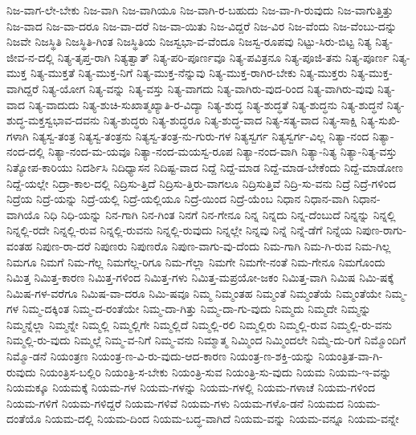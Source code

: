 {ನಿಜ-ವಾಗ-ಲೇ-ಬೇಕು
ನಿಜ-ವಾಗಿ
ನಿಜ-ವಾಗಿಯೂ
ನಿಜ-ವಾಗಿ-ರ-ಬಹುದು
ನಿಜ-ವಾ-ಗಿ-ರುವುದು
ನಿಜ-ವಾಗುತ್ತಿತ್ತು
ನಿಜ-ವಾದ
ನಿಜ-ವಾ-ದರೂ
ನಿಜ-ವಾ-ದರೆ
ನಿಜ-ವಾ-ಯಿತು
ನಿಜ-ವಿದ್ದರೆ
ನಿಜ-ವಿರ
ನಿಜ-ವೆಂದು
ನಿಜ-ವೆಂಬು-ದನ್ನು
ನಿಜವೇ
ನಿಜಸ್ಥಿತಿ
ನಿಜಸ್ಥಿತಿ-ಗಿಂತ
ನಿಜಸ್ಥಿತಿಯ
ನಿಜಸ್ವಭಾ-ವ-ವೆಂದೂ
ನಿಜಸ್ವ-ರೂಪವು
ನಿಟ್ಟು-ಸಿರು-ಬಿಟ್ಟ
ನಿತ್ಯ
ನಿತ್ಯ-ಜೀವ-ನ-ದಲ್ಲಿ
ನಿತ್ಯ-ತೃಪ್ತ-ರಾಗಿ
ನಿತ್ಯತ್ವಾತ್
ನಿತ್ಯ-ಪರಿ-ಪೂರ್ಣವೂ
ನಿತ್ಯ-ಪವಿತ್ರನೂ
ನಿತ್ಯ-ಪೂಜಿ-ತನು
ನಿತ್ಯ-ಪೂರ್ಣ
ನಿತ್ಯ-ಮುಕ್ತ
ನಿತ್ಯ-ಮುಕ್ತತೆ
ನಿತ್ಯ-ಮುಕ್ತ-ನಿಗೆ
ನಿತ್ಯ-ಮುಕ್ತ-ನೆನ್ನುವು
ನಿತ್ಯ-ಮುಕ್ತ-ರಾಗಿರ-ಬೇಕು
ನಿತ್ಯ-ಮುಕ್ತರು
ನಿತ್ಯ-ಮುಕ್ತ-ವಾಗಿದ್ದರೆ
ನಿತ್ಯ-ಯೋಗ
ನಿತ್ಯ-ವನ್ನು
ನಿತ್ಯ-ವಸ್ತು
ನಿತ್ಯ-ವಾಗದು
ನಿತ್ಯ-ವಾಗಿರು-ವುದ-ರಿಂದ
ನಿತ್ಯ-ವಾಗಿರು-ವುವು
ನಿತ್ಯ-ವಾದ
ನಿತ್ಯ-ವಾದುದು
ನಿತ್ಯ-ಶುಚಿ-ಸುಖಾತ್ಮಖ್ಯಾತಿ-ರ-ವಿದ್ಯಾ
ನಿತ್ಯ-ಶುದ್ಧ
ನಿತ್ಯ-ಶುದ್ಧತೆ
ನಿತ್ಯ-ಶುದ್ಧನು
ನಿತ್ಯ-ಶುದ್ಧನೆ
ನಿತ್ಯ-ಶುದ್ಧ-ಮಕ್ತಸ್ವಭಾವ-ದವನು
ನಿತ್ಯ-ಶುದ್ಧರು
ನಿತ್ಯ-ಶುದ್ಧರೂ
ನಿತ್ಯ-ಶುದ್ಧ-ವಾದ
ನಿತ್ಯ-ಸತ್ಯ-ವಾದ
ನಿತ್ಯ-ಸಾಕ್ಷಿ
ನಿತ್ಯ-ಸುಖಿ-ಗಳಾಗಿ
ನಿತ್ಯಸ್ವ-ತಂತ್ರ
ನಿತ್ಯಸ್ವ-ತಂತ್ರನು
ನಿತ್ಯಸ್ವ-ತಂತ್ರ-ನು-ಗುರು-ಗಳ
ನಿತ್ಯಸ್ವರ್ಗ
ನಿತ್ಯಸ್ವರ್ಗ-ವಿಲ್ಲ
ನಿತ್ಯಾ-ನಂದ
ನಿತ್ಯಾ-ನಂದ-ದಲ್ಲಿ
ನಿತ್ಯಾ-ನಂದ-ಮ-ಯವೂ
ನಿತ್ಯಾ-ನಂದ-ಮಯಸ್ವ-ರೂಪ
ನಿತ್ಯಾ-ನಂದ-ವಾಗಿ
ನಿತ್ಯಾ-ನಿತ್ಯ
ನಿತ್ಯಾ-ನಿತ್ಯ-ವಸ್ತು
ನಿತ್ಯೋಪ-ಕಾರಿಯು
ನಿದರ್ಶಿಸಿ
ನಿದಿಧ್ಯಾಸನ
ನಿದಿಷ್ಟ-ವಾದ
ನಿದ್ದೆ
ನಿದ್ದೆ-ಮಾಡ
ನಿದ್ದೆ-ಮಾಡ-ಬೇಕೆಂದು
ನಿದ್ದೆ-ಮಾಡೋಣ
ನಿದ್ದೆ-ಯಲ್ಲೇ
ನಿದ್ರಾ-ಕಾಲ-ದಲ್ಲಿ
ನಿದ್ರಿಸು-ತ್ತಿದೆ
ನಿದ್ರಿಸು-ತ್ತಿರು-ವಾಗಲೂ
ನಿದ್ರಿಸುತ್ತಿವೆ
ನಿದ್ರಿ-ಸು-ವನು
ನಿದ್ರೆ
ನಿದ್ರೆ-ಗಳಿಂದ
ನಿದ್ರೆಯ
ನಿದ್ರೆ-ಯನ್ನು
ನಿದ್ರೆ-ಯಲ್ಲಿ
ನಿದ್ರೆ-ಯಲ್ಲಿಯೂ
ನಿದ್ರೆ-ಯಿಂದ
ನಿದ್ರೆ-ಯೆಂಬ
ನಿಧಾನ
ನಿಧಾನ-ವಾಗಿ
ನಿಧಾನ-ವಾಗಿಯೊ
ನಿಧಿ
ನಿಧಿ-ಯನ್ನು
ನಿನ-ಗಾಗಿ
ನಿನ-ಗಿಂತ
ನಿನಗೆ
ನಿನ-ಗೇನೂ
ನಿನ್ನ
ನಿನ್ನದು
ನಿನ್ನ-ದೆಂಬುದೆ
ನಿನ್ನನ್ನು
ನಿನ್ನಲ್ಲಿ
ನಿನ್ನಲ್ಲಿ-ರದೇ
ನಿನ್ನಲ್ಲಿ-ರುವ
ನಿನ್ನಲ್ಲಿ-ರುವನು
ನಿನ್ನಲ್ಲಿ-ರುವುದು
ನಿನ್ನಲ್ಲೇ
ನಿನ್ನವು
ನಿನ್ನೆ
ನಿನ್ನೆ-ಡೆಗೆ
ನಿನ್ನೆಯ
ನಿಪುಣ-ರಾಗು-ವಂತಹ
ನಿಪುಣ-ರಾ-ದರೆ
ನಿಪುಣರು
ನಿಪುಣರೊ
ನಿಪುಣ-ವಾಗು-ವು-ದೆಂದು
ನಿಮ-ಗಾಗಿ
ನಿಮ-ಗಿ-ರುವ
ನಿಮ-ಗಿಲ್ಲ
ನಿಮಗೂ
ನಿಮಗೆ
ನಿಮ-ಗೆಲ್ಲ
ನಿಮಗೆಲ್ಲ-ರಿಗೂ
ನಿಮ-ಗೆಲ್ಲಾ
ನಿಮಗೇ
ನಿಮಗೇ-ನಂತೆ
ನಿಮ-ಗೇನೂ
ನಿಮಗೊಂದು
ನಿಮಿತ್ತ
ನಿಮಿತ್ತ-ಕಾರಣ
ನಿಮಿತ್ತ-ಗಳಿಂದ
ನಿಮಿತ್ತ-ಗಳು
ನಿಮಿತ್ತ-ಮಪ್ರಯೋ-ಜಕಂ
ನಿಮಿತ್ತ-ವಾಗಿ
ನಿಮಿಷ
ನಿಮಿ-ಷಕ್ಕೆ
ನಿಮಿಷ-ಗಳ-ವರೆಗೂ
ನಿಮಿಷ-ವಾ-ದರೂ
ನಿಮಿ-ಷವೂ
ನಿಮ್ಮ
ನಿಮ್ಮಂತಹ
ನಿಮ್ಮಂತೆ
ನಿಮ್ಮಂತೆಯೆ
ನಿಮ್ಮಂತೆಯೇ
ನಿಮ್ಮ-ಗಳ
ನಿಮ್ಮ-ದಕ್ಕಿಂತ
ನಿಮ್ಮ-ದ-ರಂತೆಯೇ
ನಿಮ್ಮ-ದಾ-ಗಿತ್ತು
ನಿಮ್ಮ-ದಾ-ಗು-ವುದು
ನಿಮ್ಮದು
ನಿಮ್ಮದೇ
ನಿಮ್ಮನ್ನು
ನಿಮ್ಮನ್ನೆಲ್ಲಾ
ನಿಮ್ಮನ್ನೇ
ನಿಮ್ಮಲ್ಲಿ
ನಿಮ್ಮಲ್ಲಿಗೇ
ನಿಮ್ಮಲ್ಲಿದೆ
ನಿಮ್ಮಲ್ಲಿ-ರಲಿ
ನಿಮ್ಮಲ್ಲಿರು
ನಿಮ್ಮಲ್ಲಿ-ರುವ
ನಿಮ್ಮಲ್ಲಿ-ರು-ವನು
ನಿಮ್ಮಲ್ಲಿ-ರು-ವುದು
ನಿಮ್ಮಲ್ಲೆ
ನಿಮ್ಮ-ವ-ನಿಗೆ
ನಿಮ್ಮ-ವನು
ನಿಮ್ಮಾತ್ಮ
ನಿಮ್ಮಿಂದ
ನಿಮ್ಮಿಂದಲೇ
ನಿಮ್ಮೆ-ದು-ರಿಗೆ
ನಿಮ್ಮೊಂದಿಗೆ
ನಿಮ್ಮೊ-ಡನೆ
ನಿಯಂತ್ರಣ
ನಿಯಂತ್ರ-ಣ-ವಿ-ರು-ವುದು-ಆದ-ಕಾರಣ
ನಿಯಂತ್ರ-ಣ-ಶಕ್ತಿ-ಯನ್ನು
ನಿಯಂತ್ರಿತ-ವಾ-ಗಿ-ರುವುದು
ನಿಯಂತ್ರಿಸ-ಬಲ್ಲಿರಿ
ನಿಯಂತ್ರಿ-ಸ-ಬೇಕು
ನಿಯಂತ್ರಿ-ಸುವ
ನಿಯಂತ್ರಿ-ಸು-ವುದು
ನಿಯಮ
ನಿಯಮ-ಇ-ವನ್ನು
ನಿಯಮಕ್ಕೂ
ನಿಯಮಕ್ಕೆ
ನಿಯಮ-ಗಳ
ನಿಯಮ-ಗಳನ್ನು
ನಿಯಮ-ಗಳಲ್ಲಿ
ನಿಯಮ-ಗಳಾಚೆ
ನಿಯಮ-ಗಳಿಂದ
ನಿಯಮ-ಗಳಿಗೆ
ನಿಯಮ-ಗಳಿದ್ದರೆ
ನಿಯಮ-ಗಳಿವೆ
ನಿಯಮ-ಗಳು
ನಿಯಮ-ಗಳೊ-ಡನೆ
ನಿಯಮದ
ನಿಯಮ-ದಂತೆಯೊ
ನಿಯಮ-ದಲ್ಲಿ
ನಿಯಮ-ದಿಂದ
ನಿಯಮ-ಬದ್ಧ-ವಾಗಿದೆ
ನಿಯಮ-ವನ್ನು
ನಿಯಮ-ವನ್ನೂ
ನಿಯಮ-ವನ್ನೇ
}
